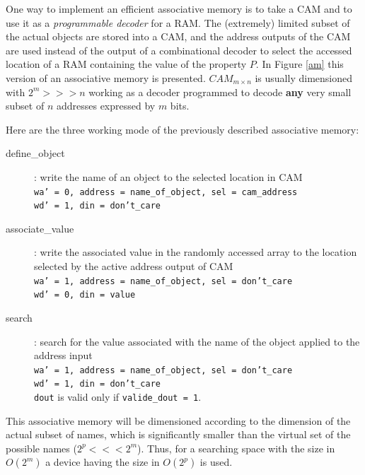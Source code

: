 One way to implement an efficient associative memory is to take a
CAM and to use it as a {\em programmable decoder} for a RAM. The
(extremely) limited subset of the actual objects are stored into a
CAM, and the address outputs of the CAM are used instead of the
output of a combinational decoder to select the accessed location
of a RAM containing the value of the property $P$. In Figure
\ref{am} this version of an associative memory is presented.
$CAM_{m \times n}$ is usually dimensioned with $2^{m} >>> n$
working as a decoder programmed to decode {\bf any} very small
subset of $n$ addresses expressed by $m$ bits.


Here are the three working mode of the previously described
associative memory:
\begin{description}
    \item[define\_object]: write the name of an object to the
    selected location in CAM
    \\ {\tt wa' = 0, address = name\_of\_object, sel = cam\_address
    \\ wd' = 1, din = don't\_care}

    \item[associate\_value]: write the associated value in the
    randomly accessed array to the location selected by the active
    address output of CAM
    \\ {\tt wa' = 1, address = name\_of\_object, sel = don't\_care
    \\ wd' = 0, din = value}

    \item[search]: search for the value associated with the name of the object
    applied to the address input
    \\ {\tt wa' = 1, address = name\_of\_object, sel = don't\_care
    \\ wd' = 1, din = don't\_care}
    \\ {\tt dout} is valid only if {\tt valide\_dout = 1}.
\end{description}

This associative memory will be dimensioned according to the
dimension of the actual subset of names, which is significantly
smaller than the virtual set of the possible names ($2^{p} <<<
2^{m}$). Thus, for a searching space with the size in $O(2^{m})$ a
device having the size in $O(2^{p})$ is used.



